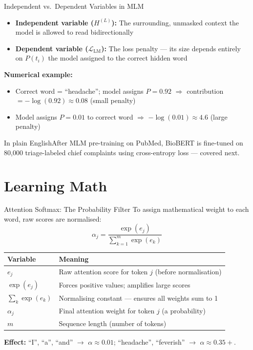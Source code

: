 \documentclass[10pt,aspectratio=169]{beamer}
\newcommand{\plain}[1]{\begin{block}{In plain English}\footnotesize #1\end{block}}
\begin{document}
\begin{frame}{Independent vs.\ Dependent Variables in MLM}
	\small
	\begin{itemize}
		\item \textbf{Independent variable ($H^{(L)}$):} The surrounding, unmasked context the model is allowed to read bidirectionally
		\item \textbf{Dependent variable ($\mathcal{L}_{\mathrm{LM}}$):} The loss penalty --- its size depends entirely on $P(t_i)$ the model assigned to the correct hidden word
	\end{itemize}
	\vspace{0.15cm}
	\textbf{Numerical example:}
	\begin{itemize}
		\item Correct word = ``headache''; model assigns $P = 0.92$ $\Rightarrow$ contribution $= -\log(0.92) \approx 0.08$ (small penalty)
		\item Model assigns $P = 0.01$ to correct word $\Rightarrow$ $-\log(0.01) \approx 4.6$ (large penalty)
	\end{itemize}
	\vspace{0.1cm}
	\plain{After MLM pre-training on PubMed, BioBERT is fine-tuned on 80{,}000 triage-labeled chief complaints using cross-entropy loss --- covered next.}
\end{frame}

\section{Learning Math}

\begin{frame}{Attention Softmax: The Probability Filter}
	\small
	To assign mathematical weight to each word, raw scores are normalised:
	\[
		\alpha_j = \frac{\exp(e_j)}{\sum_{k=1}^{m}\exp(e_k)}
	\]
	\begin{tabular}{@{}p{2.5cm}p{8.5cm}@{}}
		\toprule
		\textbf{Variable} & \textbf{Meaning} \\
		\midrule
		$e_j$ & Raw attention score for token $j$ (before normalisation) \\
		$\exp(e_j)$ & Forces positive values; amplifies large scores \\
		$\sum_k \exp(e_k)$ & Normalising constant --- ensures all weights sum to 1 \\
		$\alpha_j$ & Final attention weight for token $j$ (a probability) \\
		$m$ & Sequence length (number of tokens) \\
		\bottomrule
	\end{tabular}

	\vspace{0.1cm}
	\textbf{Effect:} ``I'', ``a'', ``and'' $\to$ $\alpha \approx 0.01$; ``headache'', ``feverish'' $\to$ $\alpha \approx 0.35+$.
\end{frame}
\end{document}
